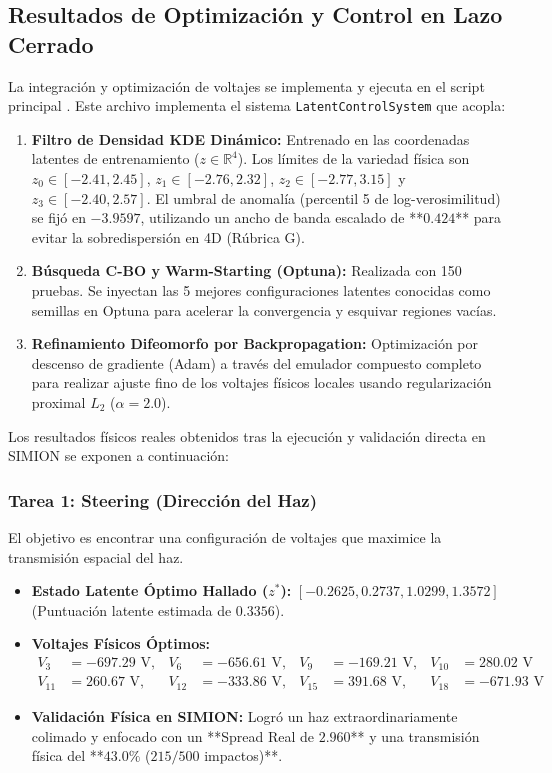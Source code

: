 \documentclass[12pt,letterpaper]{article}
\begin{document}
\subsection{Resultados de Optimización y Control en Lazo Cerrado}
La integración y optimización de voltajes se implementa y ejecuta en el script principal \textbf{}. Este archivo implementa el sistema \texttt{LatentControlSystem} que acopla:
\begin{enumerate}
    \item \textbf{Filtro de Densidad KDE Dinámico:} Entrenado en las coordenadas latentes de entrenamiento ($z \in \mathbb{R}^4$). Los límites de la variedad física son $z_0 \in [-2.41, 2.45]$, $z_1 \in [-2.76, 2.32]$, $z_2 \in [-2.77, 3.15]$ y $z_3 \in [-2.40, 2.57]$. El umbral de anomalía (percentil 5 de log-verosimilitud) se fijó en \textbf{$-3.9597$}, utilizando un ancho de banda escalado de **$0.424$** para evitar la sobredispersión en 4D (Rúbrica G).
    \item \textbf{Búsqueda C-BO y Warm-Starting (Optuna):} Realizada con 150 pruebas. Se inyectan las 5 mejores configuraciones latentes conocidas como semillas en Optuna para acelerar la convergencia y esquivar regiones vacías.
    \item \textbf{Refinamiento Difeomorfo por Backpropagation:} Optimización por descenso de gradiente (Adam) a través del emulador compuesto completo para realizar ajuste fino de los voltajes físicos locales usando regularización proximal $L_2$ ($\alpha = 2.0$).
\end{enumerate}

Los resultados físicos reales obtenidos tras la ejecución y validación directa en SIMION se exponen a continuación:

\subsubsection{Tarea 1: Steering (Dirección del Haz)}
El objetivo es encontrar una configuración de voltajes que maximice la transmisión espacial del haz.
\begin{itemize}
    \item \textbf{Estado Latente Óptimo Hallado ($z^*$):} $[-0.2625, 0.2737, 1.0299, 1.3572]$ (Puntuación latente estimada de $0.3356$).
    \item \textbf{Voltajes Físicos Óptimos:} 
    \begin{align*}
        V_3 &= -697.29\text{ V}, & V_6 &= -656.61\text{ V}, & V_9 &= -169.21\text{ V}, & V_{10} &= 280.02\text{ V} \\
        V_{11} &= 260.67\text{ V}, & V_{12} &= -333.86\text{ V}, & V_{15} &= 391.68\text{ V}, & V_{18} &= -671.93\text{ V}
    \end{align*}
    \item \textbf{Validación Física en SIMION:} Logró un haz extraordinariamente colimado y enfocado con un **Spread Real de $2.960$** y una transmisión física del **$43.0\%$ ($215/500$ impactos)**.
\end{itemize}
\end{document}
